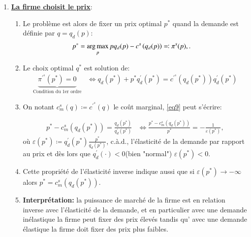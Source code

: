\begin{frame}
\begin{itemize}
\begin{enumerate}
  \item \textbf{\underline{La firme choisit le prix}}:
  \begin{enumerate}[$\cdot$]
  \item Le problème est alors de fixer un prix optimal $p^*$ quand la demande est définie par $q = q_d(p)$:
  \begin{align}
  p^* &= \argmax_{p} pq_d(p)- c^s\left(q_d(p)\right) \eqqcolon \pi^s(p), \label{eq9}.
  \end{align}
   \item  Le choix optimal $q^*$ est solution de:
  \begin{align}
   \underbrace{\pi^{\prime^s}(p^*) = 0}_{\text{Condition du 1er ordre}}&\Leftrightarrow  q_d(p^*) + p^*q_d^\prime(p^*) = c^{\prime^s}\left(q_d(p^*)\right)q_d^\prime(p^*)
   \label{eq9}
  \end{align}
  \item On notant $c^s_m(q)\coloneqq  c^{\prime^s}(q)$ le coût marginal, \eqref{eq9} peut s'écrire:
  
  \begin{align}
  p^* - c^s_m\left(q_d(p^*)\right) = \frac{q_d(p^*)}{q_d^\prime(p^*)} &\Leftrightarrow \frac{p^* - c^s_m\left(q_d(p^*)\right)}{p^*} = -\frac{1}{\varepsilon(p^*)},
  \label{eq10}
  \end{align}
  où $\varepsilon(p^*) \coloneqq q_d^\prime(p^*) \frac{p^*}{q_d(p^*)}$, c.à.d., l'élasticité de la demande par rapport au prix et dès lors que $q_d^\prime(\cdot)<0$(bien "normal")  $\varepsilon(p^*)<0$.
  \item Cette propriété de l'élasticité inverse indique aussi que si $\varepsilon(p^*) \to -\infty$ alors $p^* =  c^s_m\left(q_d(p^*)\right)$.
  \item \textbf{Interprétation:} la puissance de marché de la firme est en relation inverse avec l'élasticité de la demande, et en particulier  avec une demande inélastique la firme peut fixer des prix élevés tandis qu' avec une demande élastique la firme doit fixer des prix plus faibles.
  \end{enumerate}
  \end{enumerate}
  \end{itemize}
  \end{frame}

